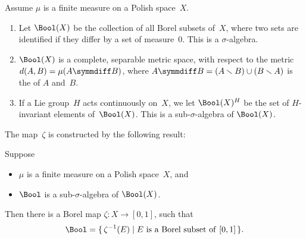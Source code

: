 \begin{defns} \label{BoolDefn}
Assume $\mu$ is a finite measure on a Polish space~$X$.
	\begin{enumerate}
	\item Let 
	$\Bool(X)$ be the collection of all Borel subsets of~$X$, where two sets are identified if they differ by a set of measure~$0$. This is a $\sigma$-algebra.
	\item $\Bool(X)$ is a complete, separable metric space, with respect to the metric $d(A,B) = \mu(A \symmdiff B)$, where 
	$A \symmdiff B = (A \smallsetminus B) \cup (B \smallsetminus A)$ is the  of $A$ and~$B$.
 	\item If a Lie group~$H$ acts continuously on~$X$, we let $\Bool(X)^H$ be the set of $H$-invariant elements of~$\Bool(X)$. This is a sub-$\sigma$-algebra of $\Bool(X)$.
	\end{enumerate}
\end{defns}

The map~$\zeta$ is constructed by the following result:
 
 \begin{lem}
 Suppose 
 	\begin{itemize}
	\item $\mu$ is a finite measure on a Polish space~$X$,
	and
	\item $\Bool$ is a sub-$\sigma$-algebra of $\Bool(X)$.
	\end{itemize}
Then there is a Borel map $\zeta \colon X \to [0,1]$, such that 
	$$ \Bool = \{\, \zeta^{-1}(E) \mid \text{$E$ is a Borel subset of\/ $[0,1]$} \,\} .$$
\end{lem}

